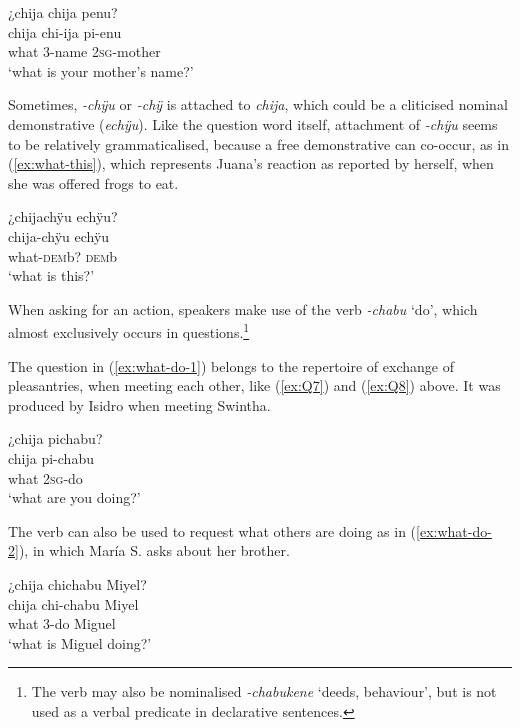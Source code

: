 \ea\label{ex:what-name}
\begingl
\glpreamble ¿chija chija penu?\\
\gla chija chi-ija pi-enu\\
\glb what 3-name 2\textsc{sg}-mother\\
\glft ‘what is your mother’s name?’
\endgl
\trailingcitation{[uxx-p110825l.144]}
\xe

Sometimes, \textit{-chÿu} or \textit{-chÿ} is attached to \textit{chija}, which could be a cliticised nominal demonstrative (\textit{echÿu}). Like the question word itself, attachment of \textit{-chÿu} seems to be relatively grammaticalised, because a free demonstrative can co-occur, as in (\ref{ex:what-this}), which represents Juana’s reaction as reported by herself, when she was offered frogs to eat.

\ea\label{ex:what-this}
\begingl
\glpreamble ¿chijachÿu echÿu?\\
\gla chija-chÿu echÿu\\
\glb what-\textsc{dem}b? \textsc{dem}b\\
\glft ‘what is this?’
\endgl
\trailingcitation{[jxx-a120516l-a.479]}
\xe
{}

When asking for an action, speakers make use of the verb \textit{-chabu} ‘do’, which almost exclusively occurs in questions.\footnote{The verb may also be nominalised \textit{-chabukene} ‘deeds, behaviour’, but is not used as a verbal predicate in declarative sentences.} 

The question in (\ref{ex:what-do-1}) belongs to the repertoire of exchange of pleasantries, when meeting each other, like (\ref{ex:Q7}) and (\ref{ex:Q8}) above. It was produced by Isidro when meeting Swintha.

\ea\label{ex:what-do-1}
\begingl
\glpreamble ¿chija pichabu?\\
\gla chija pi-chabu\\
\glb what 2\textsc{sg}-do\\
\glft ‘what are you doing?’
\endgl
\trailingcitation{[mdx-c120416ls.005]}
\xe

The verb can also be used to request what others are doing as in (\ref{ex:what-do-2}), in which María S. asks about her brother.

\ea\label{ex:what-do-2}
\begingl
\glpreamble ¿chija chichabu Miyel?\\
\gla chija chi-chabu Miyel\\
\glb what 3-do Miguel\\
\glft ‘what is Miguel doing?’
\endgl
\trailingcitation{[rxx-e120511l.337]}
\xe

